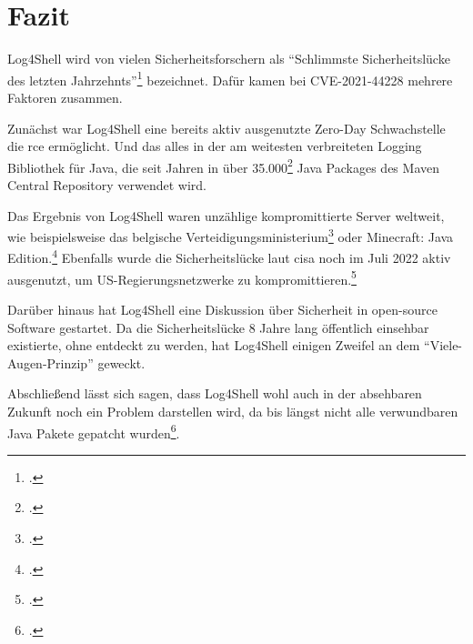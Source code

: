 
\section{Fazit}\label{sec:fazit}
Log4Shell wird von vielen Sicherheitsforschern als ``Schlimmste Sicherheitslücke des letzten Jahrzehnts''\footcite{guardianArticle} bezeichnet.
Dafür kamen bei CVE-2021-44228 mehrere Faktoren zusammen.

Zunächst war Log4Shell eine bereits aktiv ausgenutzte Zero-Day Schwachstelle die \gls{rce} ermöglicht.
Und das alles in der am weitesten verbreiteten Logging Bibliothek für Java, die seit Jahren in über 35.000\footcite{impact} Java Packages des Maven Central Repository verwendet wird.

\bigskip
Das Ergebnis von Log4Shell waren unzählige kompromittierte Server weltweit, wie beispielsweise das belgische Verteidigungsministerium\footcite{zdNet} oder Minecraft: Java Edition.\footcite{minecraftForum}
Ebenfalls wurde die Sicherheitslücke laut \gls{cisa} noch im Juli 2022 aktiv ausgenutzt, um US-Regierungsnetzwerke zu kompromittieren.\footcite{cisaAlert}

Darüber hinaus hat Log4Shell eine Diskussion über Sicherheit in open-source Software gestartet.
Da die Sicherheitslücke 8 Jahre lang öffentlich einsehbar existierte, ohne entdeckt zu werden, hat Log4Shell einigen Zweifel an dem ``Viele-Augen-Prinzip'' geweckt.

\bigskip
Abschließend lässt sich sagen, dass Log4Shell wohl auch in der absehbaren Zukunft noch ein Problem darstellen wird, da bis längst nicht alle verwundbaren Java Pakete gepatcht wurden\footcite{kaspersky}.